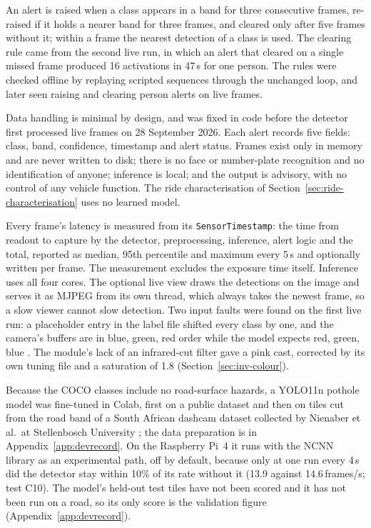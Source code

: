 An alert is raised when a class appears in a band for three consecutive frames, re-raised if it holds a nearer band for three frames, and cleared only after five frames without it; within a frame the nearest detection of a class is used. The clearing rule came from the second live run, in which an alert that cleared on a single missed frame produced 16 activations in 47\,s for one person. The rules were checked offline by replaying scripted sequences through the unchanged loop, and later seen raising and clearing person alerts on live frames.

Data handling is minimal by design, and was fixed in code before the detector first processed live frames on 28 September 2026. Each alert records five fields: class, band, confidence, timestamp and alert status. Frames exist only in memory and are never written to disk; there is no face or number-plate recognition and no identification of anyone; inference is local; and the output is advisory, with no control of any vehicle function. The ride characterisation of Section~\ref{sec:ride-characterisation} uses no learned model.

Every frame's latency is measured from its \texttt{SensorTimestamp}: the time from readout to capture by the detector, preprocessing, inference, alert logic and the total, reported as median, 95th percentile and maximum every 5\,s and optionally written per frame. The measurement excludes the exposure time itself. Inference uses all four cores. The optional live view draws the detections on the image and serves it as MJPEG from its own thread, which always takes the newest frame, so a slow viewer cannot slow detection. Two input faults were found on the first live run: a placeholder entry in the label file shifted every class by one, and the camera's buffers are in blue, green, red order while the model expects red, green, blue \cite{picamera2manual}. The module's lack of an infrared-cut filter gave a pink cast, corrected by its own tuning file and a saturation of 1.8 (Section~\ref{sec:inv-colour}).

Because the COCO classes include no road-surface hazards, a YOLO11n pothole model \cite{ultralytics2024yolo11} was fine-tuned in Colab, first on a public dataset \cite{gerapothole} and then on tiles cut from the road band of a South African dashcam dataset collected by Nienaber et al.\ at Stellenbosch University \cite{nienaber2015dataset}; the data preparation is in Appendix~\ref{app:devrecord}. On the Raspberry Pi~4 it runs with the NCNN library \cite{ncnn} as an experimental path, off by default, because only at one run every 4\,s did the detector stay within 10\% of its rate without it (13.9 against 14.6\,frames/s; test C10). The model's held-out test tiles have not been scored and it has not been run on a road, so its only score is the validation figure (Appendix~\ref{app:devrecord}).

